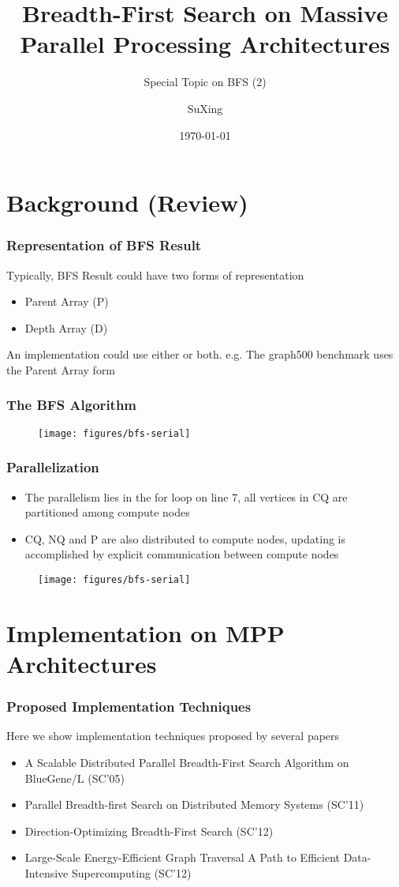 \documentclass[]{beamer}
\title{Breadth-First Search on Massive Parallel Processing Architectures}
\subtitle{Special Topic on BFS (2)}
\author[SuXing~pysuxing@gmail.com]{SuXing}
\institute{TOW}
\date{\today}
\begin{document}
\setlength{\parindent}{0pt}

\frame{\titlepage}
\frame{\tableofcontents}

\section{Background (Review)}
\frame{\tableofcontents[currentsection]}

\begin{frame}
  \frametitle{Representation of BFS Result}
  Typically, BFS Result could have two forms of representation
  \begin{itemize}
    \item Parent Array (P)
    \item Depth Array (D)
  \end{itemize}
  An implementation could use either or both. e.g. The graph500 benchmark
  uses the Parent Array form
\end{frame}

\begin{frame}
  \frametitle{The BFS Algorithm}
  \begin{figure}
    \centering
    \texttt{[image: figures/bfs-serial]}
  \end{figure}
\end{frame}

\begin{frame}
  \frametitle{Parallelization}
  \begin{itemize}
    \item The parallelism lies in the for loop on line 7, all vertices in CQ
      are partitioned among compute nodes
    \item CQ, NQ and P are also distributed to compute nodes, updating is
      accomplished by explicit communication between compute nodes
  \end{itemize}
  \begin{figure}
    \centering
    \texttt{[image: figures/bfs-serial]}
  \end{figure}
\end{frame}

\section{Implementation on MPP Architectures}
\frame{\tableofcontents[currentsection]}

\begin{frame}
  \frametitle{Proposed Implementation Techniques}
  Here we show implementation techniques proposed by several papers
  \begin{itemize}
    \item A Scalable Distributed Parallel Breadth-First Search Algorithm on BlueGene/L (SC'05)
    \item Parallel Breadth-first Search on Distributed Memory Systems (SC'11)
    \item Direction-Optimizing Breadth-First Search (SC'12)
    \item Large-Scale Energy-Efficient Graph Traversal A Path to Efficient Data-Intensive Supercomputing (SC'12)
  \end{itemize}
\end{frame}
\end{document}
